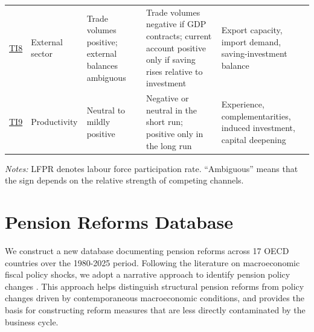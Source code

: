 \documentclass[11pt,english,a4paper, twoside, authoryear]{article}
\begin{document}
\begin{table}[H]
\begin{singlespace}
\begin{tabularx}{\textwidth}{p{1.1cm}p{3.2cm}p{2.7cm}p{3.2cm}X}
\hyperref[test:external]{TI8} 
& External sector
& Trade volumes positive; external balances ambiguous
& Trade volumes negative if GDP contracts; current account positive only if saving rises relative to investment
& Export capacity, import demand, saving-investment balance \\

\hyperref[test:prod]{TI9} 
& Productivity
& Neutral to mildly positive
& Negative or neutral in the short run; positive only in the long run
& Experience, complementarities, induced investment, capital deepening \\

\bottomrule
\end{tabularx}

\vspace{-0.35cm}
\scriptsize 
\begin{flushleft}
\emph{Notes:} LFPR denotes labour force participation rate. ``Ambiguous'' means that the sign depends on the relative strength of competing channels.
\end{flushleft}
\end{singlespace}
\noalign{\vspace{-8pt}}

\end{table}


\section{Pension Reforms Database}\label{sec:data}

We construct a new database documenting pension reforms across 17 OECD countries over the 1980-2025 period. Following the literature on macroeconomic fiscal policy shocks, we adopt a narrative approach \citep{RomerRomer2010, Ramey2009} to identify pension policy changes \citep{Beetsma2020, BiZubairy2023, romp_political_2024}. This approach helps distinguish structural pension reforms from policy changes driven by contemporaneous macroeconomic conditions, and provides the basis for constructing reform measures that are less directly contaminated by the business cycle.
\end{document}
